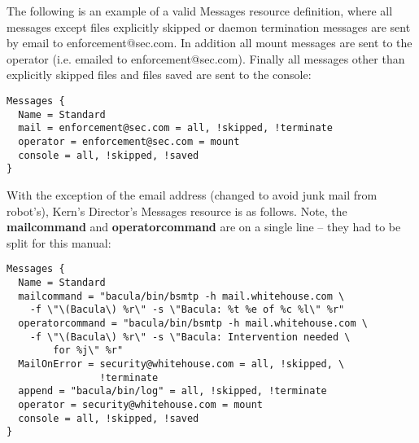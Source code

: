 The following is an example of a valid Messages resource definition, where all
messages except files explicitly skipped or daemon termination messages are
sent by email to enforcement@sec.com. In addition all mount messages are sent
to the operator (i.e. emailed to enforcement@sec.com). Finally all messages
other than explicitly skipped files and files saved are sent to the console: 

\footnotesize
\begin{verbatim}
Messages {
  Name = Standard
  mail = enforcement@sec.com = all, !skipped, !terminate
  operator = enforcement@sec.com = mount
  console = all, !skipped, !saved
}
\end{verbatim}
\normalsize

With the exception of the email address (changed to avoid junk mail from
robot's), Kern's Director's Messages resource is as follows. Note, the {\bf
mailcommand} and {\bf operatorcommand} are on a single line -- they had to be
split for this manual: 

\footnotesize
\begin{verbatim}
Messages {
  Name = Standard
  mailcommand = "bacula/bin/bsmtp -h mail.whitehouse.com \
    -f \"\(Bacula\) %r\" -s \"Bacula: %t %e of %c %l\" %r"
  operatorcommand = "bacula/bin/bsmtp -h mail.whitehouse.com \
    -f \"\(Bacula\) %r\" -s \"Bacula: Intervention needed \
        for %j\" %r"
  MailOnError = security@whitehouse.com = all, !skipped, \
                !terminate
  append = "bacula/bin/log" = all, !skipped, !terminate
  operator = security@whitehouse.com = mount
  console = all, !skipped, !saved
}
\end{verbatim}
\normalsize
